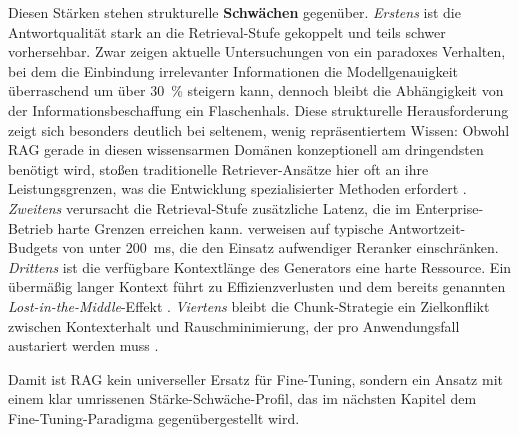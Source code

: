 Diesen Stärken stehen strukturelle \textbf{Schwächen} gegenüber. \textit{Erstens} ist die Antwortqualität stark an die Re\-trie\-val-St\-ufe gekoppelt und teils schwer vorhersehbar. Zwar zeigen aktuelle Untersuchungen von \textcite[14]{Gao.2024} ein paradoxes Verhalten, bei dem die Einbindung irrelevanter Informationen die Modellgenauigkeit überraschend um über 30~\% steigern kann, dennoch bleibt die Abhängigkeit von der Informationsbeschaffung ein Flaschenhals. Diese strukturelle Herausforderung zeigt sich besonders deutlich bei seltenem, wenig repräsentiertem Wissen: Obwohl RAG gerade in diesen wissensarmen Domänen konzeptionell am dringendsten benötigt wird, stoßen traditionelle Retriever-Ansätze hier oft an ihre Leistungsgrenzen, was die Entwicklung spezialisierter Methoden erfordert \autocite[vgl.][2]{Soudani.2024}. %
\textit{Zweitens} verursacht die Retrieval-Stufe zusätzliche Latenz, die im Enterprise-Betrieb harte Grenzen erreichen kann. \textcite[20]{Karakurt.2026} verweisen auf typische Antwortzeit-Budgets von unter 200~ms, die den Einsatz aufwendiger Reranker einschränken.
\textit{Drittens} ist die verfügbare Kontextlänge des Generators eine harte Ressource. Ein übermäßig langer Kontext führt zu Effizienzverlusten und dem bereits genannten \textit{Lost-in-the-Middle}-Effekt \autocite[10]{Gao.2024}.
\textit{Viertens} bleibt die Chunk-Strategie ein Zielkonflikt zwischen Kontexterhalt und Rauschminimierung, der pro Anwendungsfall austariert werden muss \autocite[8]{Gao.2024}.

Damit ist RAG kein universeller Ersatz für Fine-Tuning, sondern ein Ansatz mit einem klar umrissenen Stärke-Schwäche-Profil, das im nächsten Kapitel dem Fine-Tuning-Paradigma gegenübergestellt wird.
